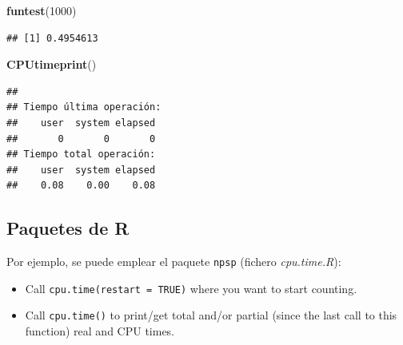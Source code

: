 \documentclass[]{book}
\newenvironment{Shaded}{\begin{snugshade}}{\end{snugshade}}
\newcommand{\KeywordTok}[1]{\textcolor[rgb]{0.13,0.29,0.53}{\textbf{#1}}}
\newcommand{\DecValTok}[1]{\textcolor[rgb]{0.00,0.00,0.81}{#1}}
\newcommand{\NormalTok}[1]{#1}
\theoremstyle{definition}
\theoremstyle{definition}
\theoremstyle{definition}
\theoremstyle{remark}
\begin{document}
\begin{Shaded}
\begin{Highlighting}[]
\KeywordTok{funtest}\NormalTok{(}\DecValTok{1000}\NormalTok{)}
\end{Highlighting}
\end{Shaded}

\begin{verbatim}
## [1] 0.4954613
\end{verbatim}

\begin{Shaded}
\begin{Highlighting}[]
\KeywordTok{CPUtimeprint}\NormalTok{()}
\end{Highlighting}
\end{Shaded}

\begin{verbatim}
## 
## Tiempo última operación:
##    user  system elapsed 
##       0       0       0 
## Tiempo total operación:
##    user  system elapsed 
##    0.08    0.00    0.08
\end{verbatim}

\subsection{Paquetes de R}\label{paquetes-de-r-1}

Por ejemplo, se puede emplear el paquete \texttt{npsp} (fichero
\emph{cpu.time.R}):

\begin{itemize}
\item
  Call \texttt{cpu.time(restart\ =\ TRUE)} where you want to start
  counting.
\item
  Call \texttt{cpu.time()} to print/get total and/or partial (since the
  last call to this function) real and CPU times.
\end{itemize}
\end{document}
